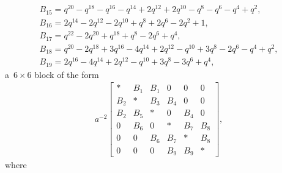 \documentclass[10pt,a4paper]{amsart}
\numberwithin{equation}{section}
\theoremstyle{definition}
\newcommand{\flac}[2]{#1}
\begin{document}
\begin{gather*}
 B_{15} =
\flac{q^{20}}{a^2}-\flac{q^{18}}{a^2}-\flac{q^{16}}{a^2}-\flac{q^{14}}{a^2}+\flac{2q^{12}}{a^2}+\flac{2q^{10}}{a^2}-\flac{q^{8}}{a^2}-\flac{q^{6}}{a^2}-\flac{q^{4}}{a^2}+\flac{q^{2}}{a^2}, \\
 B_{16} =
\flac{2q^{14}}{a^2}-\flac{2q^{12}}{a^2}-\flac{2q^{10}}{a^2}+\flac{q^{8}}{a^2}+\flac{2q^{6}}{a^2}-\flac{2q^{2}}{a^2}+\flac{1}{a^2}, \\
 B_{17} =
\flac{q^{22}}{a^2}-\flac{2q^{20}}{a^2}+\flac{q^{18}}{a^2}+\flac{q^{8}}{a^2}-\flac{2q^{6}}{a^2}+\flac{q^{4}}{a^2}, \\
 B_{18} =
\flac{q^{20}}{a^2}-\flac{2q^{18}}{a^2}+\flac{3q^{16}}{a^2}-\flac{4q^{14}}{a^2}+\flac{2q^{12}}{a^2}-\flac{q^{10}}{a^2}+\flac{3q^{8}}{a^2}-\flac{2q^{6}}{a^2}-\flac{q^{4}}{a^2}+\flac{q^{2}}{a^2}, \\
 B_{19} =
\flac{2q^{16}}{a^2}-\flac{4q^{14}}{a^2}+\flac{2q^{12}}{a^2}-\flac{q^{10}}{a^2}+\flac{3q^{8}}{a^2}-\flac{3q^{6}}{a^2}+\flac{q^{4}}{a^2},
\end{gather*}
a~$6 \times 6$ block of the form
\begin{align*}
a^{-2}
 \begin{bmatrix}
 * & B_1 & B_1 & 0 & 0 & 0 \\
 B_2 & * & B_3 & B_4 & 0 & 0 \\
 B_2 & B_5 & * & 0 & B_4 & 0 \\
 0 & B_6 & 0 & * & B_7 & B_8 \\
 0 & 0 & B_6 & B_7 & * & B_8 \\
 0 & 0 & 0 & B_9 & B_9 & *
 \end{bmatrix},
\end{align*}
where
\end{document}
